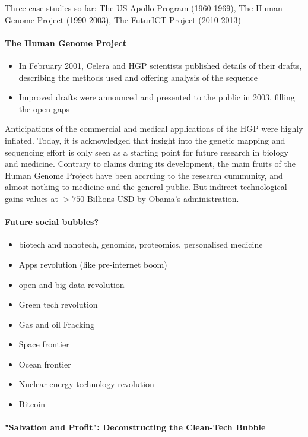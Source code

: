 Three case studies so far: The US Apollo Program (1960-1969),
The Human Genome Project (1990-2003), The FuturICT Project (2010-2013)

\paragraph{The Human Genome Project}

\begin{itemize}
    \item In February 2001, Celera and HGP scientists published details of their
        drafts, describing the methods used and offering analysis of the
        sequence
    \item Improved drafts were announced and presented to the public in 2003,
        filling the open gaps
\end{itemize}

Anticipations of the commercial and medical applications of the HGP were highly
inflated. Today, it is acknowledged that insight into the genetic mapping and
sequencing effort is only seen as a starting point for future research in
biology and medicine. Contrary to claims during its development, the main fruits
of the Human Genome Project have been accruing to the research cummunity, and
almost nothing to medicine and the general public. But indirect technological
gains values at $>750$ Billions USD by Obama's administration.

\paragraph{Future social bubbles?}

\begin{itemize}
    \item biotech and nanotech, genomics, proteomics, personalised medicine
    \item Apps revolution (like pre-internet boom)
    \item open and big data revolution
    \item Green tech revolution
    \item Gas and oil Fracking
    \item Space frontier
    \item Ocean frontier
    \item Nuclear energy technology revolution
    \item Bitcoin
\end{itemize}

\paragraph{"Salvation and Profit": Deconstructing the Clean-Tech Bubble}

